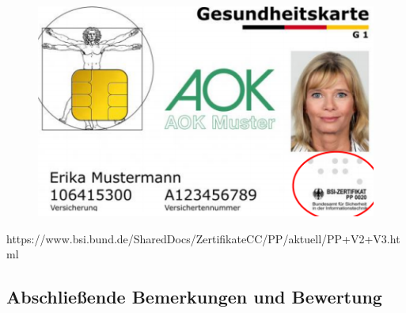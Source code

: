 \documentclass[openany]{book}
\begin{document}
\begin{figure}[h!]
    \centering
    \includegraphics[width=0.85\linewidth]{Pics/HealthCard.PNG}
\end{figure}

https://www.bsi.bund.de/SharedDocs/Zertifikate\textunderscore CC/PP/aktuell/PP+V2+V3.html

\subsection{Abschließende Bemerkungen und Bewertung}
\end{document}
